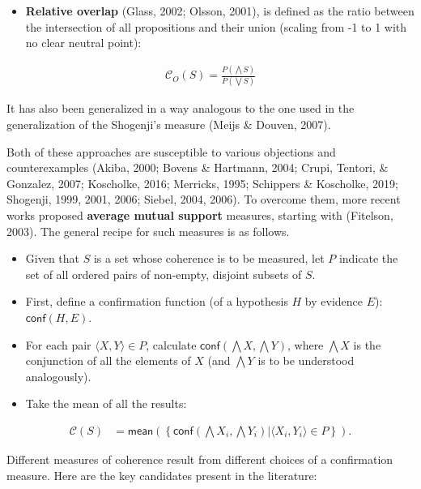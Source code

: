\documentclass[
  10pt,
]{scrartcl}
\providecommand{\tightlist}{%
  \setlength{\itemsep}{0pt}\setlength{\parskip}{0pt}}
\begin{document}
\begin{itemize}
\tightlist
\item
  \textbf{Relative overlap} (Glass, 2002; Olsson, 2001), is defined as the ratio between the intersection of all propositions and their union (scaling from -1 to 1 with no clear neutral point):
\end{itemize}

\begin{align}
    \tag{Olsson}
    \label{coh:Olsson}
    \mathcal{C}_{O}(S)=\frac{P(\bigwedge S)}{P(\bigvee S)}
\end{align}

\noindent It has also been generalized in a way analogous to the one used in the generalization of the Shogenji's measure (Meijs \& Douven, 2007).

Both of these approaches are susceptible to various objections and counterexamples (Akiba, 2000; Bovens \& Hartmann, 2004; Crupi, Tentori, \& Gonzalez, 2007; Koscholke, 2016; Merricks, 1995; Schippers \& Koscholke, 2019; Shogenji, 1999, 2001, 2006; Siebel, 2004, 2006). To overcome them, more recent works proposed \textbf{average mutual support} measures, starting with (Fitelson, 2003). The general recipe for such measures is as follows.

\begin{itemize}
\item
  Given that \(S\) is a set whose coherence is to be measured, let \(P\)
  indicate the set of all ordered pairs of non-empty, disjoint subsets
  of \(S\).
\item
  First, define a confirmation function (of  a hypothesis \(H\) by evidence  \(E\)): \(\mathsf{conf}(H,E)\).
\item
  For each pair \(\langle X, Y \rangle \in P\), calculate
  \(\mathsf{conf}(\bigwedge X, \bigwedge Y)\), where $\bigwedge X$  is the conjunction of all the elements of $X$ (and $\bigwedge Y$ is to be understood analogously).
\item
  Take the mean of all the results:
\end{itemize}

\begin{align*}
    \mathcal{C}(S) & =
\mathsf{mean}\left(\left\{\mathsf{conf}(\bigwedge X_i, \bigwedge Y_i) | \langle X_i, Y_i \rangle \in P\right\} \right).
\end{align*}

\noindent Different measures of coherence result from different choices of a confirmation measure. Here are the key candidates present in the literature:
\end{document}
